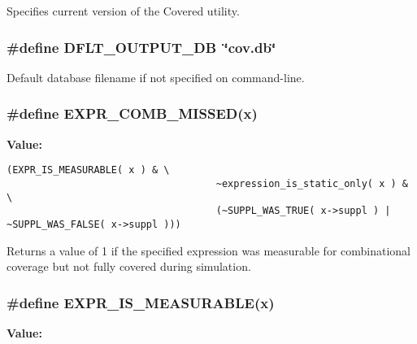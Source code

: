 Specifies current version of the Covered utility. 
\subsubsection{\setlength{\rightskip}{0pt plus 5cm}\#define DFLT\_\-OUTPUT\_\-DB\ \char`\"{}cov.db\char`\"{}}\label{defines_8h_a2}


Default database filename if not specified on command-line. 
\subsubsection{\setlength{\rightskip}{0pt plus 5cm}\#define EXPR\_\-COMB\_\-MISSED(x)}\label{defines_8h_a131}


{\bf Value:}

\footnotesize\begin{verbatim}(EXPR_IS_MEASURABLE( x ) & \
                                    ~expression_is_static_only( x ) & \
                                    (~SUPPL_WAS_TRUE( x->suppl ) | ~SUPPL_WAS_FALSE( x->suppl )))
\end{verbatim}\normalsize 
Returns a value of 1 if the specified expression was measurable for combinational coverage but not fully covered during simulation. 
\subsubsection{\setlength{\rightskip}{0pt plus 5cm}\#define EXPR\_\-IS\_\-MEASURABLE(x)}\label{defines_8h_a129}


{\bf Value:}

